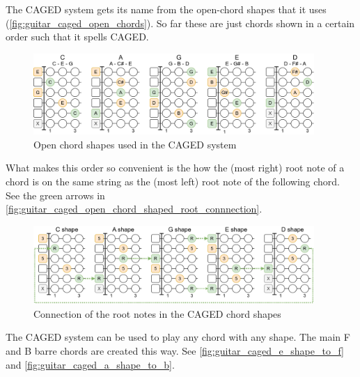 The CAGED system gets its name from the open-chord shapes that it uses (\autoref{fig:guitar_caged_open_chords}). So far these are just chords shown in a certain order such that it spells CAGED.

\begin{figure}[h]
	\centering
	\includegraphics[width=0.95\textwidth]{../../Images/CagedOpenChords.png}
	\caption{Open chord shapes used in the CAGED system}
	\label{fig:guitar_caged_open_chords}
\end{figure}

What makes this order so convenient is the how the (most right) root note of a chord is on the same string as the (most left) root note of the following chord. See the green arrows in \autoref{fig:guitar_caged_open_chord_shaped_root_connnection}.

\begin{figure}[h]
	\centering
	\includegraphics[width=0.95\textwidth]{../../Images/CagedOpenChordShapesRootConnection.png}
	\caption{Connection of the root notes in the CAGED chord shapes}
	\label{fig:guitar_caged_open_chord_shaped_root_connnection}
\end{figure}

The CAGED system can be used to play any chord with any shape. The main F and B barre chords are created this way. See \autoref{fig:guitar_caged_e_shape_to_f} and \autoref{fig:guitar_caged_a_shape_to_b}.

